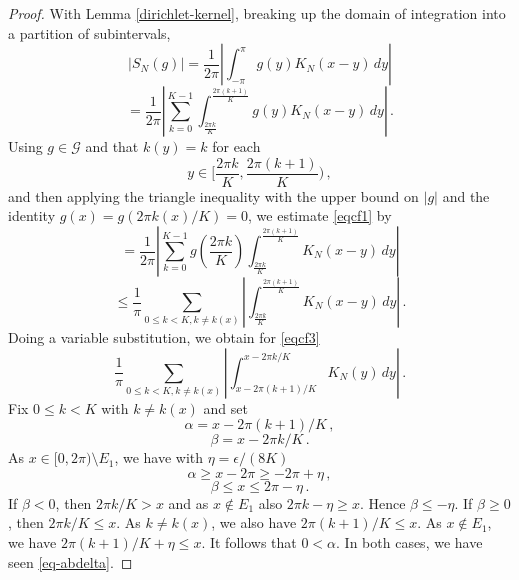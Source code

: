 {\begin{proof}
   With Lemma \ref{dirichlet-kernel}, breaking up the domain of integration into a
   partition of subintervals,
   \begin{equation*}
      |S_N(g)|= \frac{1}{2\pi} \left|\int_{-\pi}^{\pi} g(y)K_N(x-y)\, dy\right|
   \end{equation*}
   \begin{equation}\label{eqcf1}
  =  \frac{1}{2\pi} \left|\sum_{k=0}^{K-1}\int_{\frac{2\pi k}K}^{\frac{2\pi (k+1)}K} g(y)K_N(x-y)\, dy\right|\, .
   \end{equation}
Using $g\in \mathcal{G}$ and that $ k(y)=k$ for each
\begin{equation}
    y\in [\frac {2\pi k}K, \frac{2\pi (k+1)}K)\, ,
\end{equation}
and then applying the triangle inequality with the upper bound on $|g|$ and the identity $g(x)=g(2\pi k(x)/K)=0$,  we estimate \eqref{eqcf1} by
      \begin{equation*}
  =  \frac{1}{2\pi} \left|\sum_{k=0}^{K-1} g(\frac{2\pi k}K) \int_{\frac{2\pi k}K}^{\frac{2\pi (k+1)}K} K_N(x-y)\, dy\right|
   \end{equation*}
      \begin{equation}\label{eqcf3}
  \le \frac{1}{\pi} \sum_{0\le k<K, k\neq k(x)} \left|\int_{\frac{2\pi k}K}^{\frac{2\pi (k+1)}K} K_N(x-y)\, dy\right|\, .
   \end{equation}
Doing a variable substitution, we obtain for \eqref{eqcf3}
\begin{equation}
  \frac{1}{\pi} \sum_{0\le k<K, k\neq k(x)}
   \left|\int_{x-2\pi (k+1)/K}^{x-2\pi k/K} K_N(y)\, dy\right|\, .
\end{equation}
Fix $0\le k<K$ with $k\neq k(x)$ and set
\begin{equation}
    \alpha=x-2\pi (k+1)/K\, ,
\end{equation}
\begin{equation}
    \beta=x-2\pi k/K\, .
\end{equation}
As $x\in [0,2\pi)\setminus E_1$, we have
with $\eta=\epsilon/(8K)$
\begin{equation}
    \alpha\ge x-2\pi\ge -2\pi+\eta\, ,
\end{equation}
\begin{equation}
    \beta\le x \le 2\pi -\eta\, .
\end{equation}
If $\beta< 0$, then $2\pi k/K> x$ and as $x\not \in E_1$ also
$2\pi k-\eta \ge x$. Hence $\beta \le -\eta $. If $\beta \ge 0$, then $2\pi k/K\le x$. As $k\neq k(x)$, we also have
$2\pi (k+1)/K\le x$. As $x\not \in E_1$, we have
$2\pi (k+1)/K+\eta \le x$. It follows that
$0<\alpha$. In both cases, we have seen
\eqref{eq-abdelta}.




\end{proof}}
